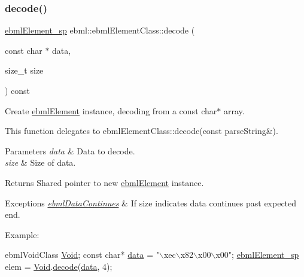 \subsubsection{\texorpdfstring{decode()}{decode()}\hspace{0.1cm}{\footnotesize\ttfamily [3/10]}}
{\footnotesize\ttfamily \mbox{\hyperlink{namespaceebml_adad533b7705a16bb360fe56380c5e7be}{ebml\+Element\+\_\+sp}} ebml\+::ebml\+Element\+Class\+::decode (\begin{DoxyParamCaption}\item[{const char $\ast$}]{data,  }\item[{size\+\_\+t}]{size }\end{DoxyParamCaption}) const}

Create \mbox{\hyperlink{classebml_1_1ebmlElement}{ebml\+Element}} instance, decoding from a const char$\ast$ array.

This function delegates to ebml\+Element\+Class\+::decode(const parse\+String\&).


\begin{DoxyParams}{Parameters}
{\em data} & Data to decode. \\
\hline
{\em size} & Size of \textquotesingle{}data\textquotesingle{}. \\
\hline
\end{DoxyParams}
\begin{DoxyReturn}{Returns}
Shared pointer to new \mbox{\hyperlink{classebml_1_1ebmlElement}{ebml\+Element}} instance. 
\end{DoxyReturn}

\begin{DoxyExceptions}{Exceptions}
{\em \mbox{\hyperlink{classebml_1_1ebmlDataContinues}{ebml\+Data\+Continues}}} & If \textquotesingle{}size\textquotesingle{} indicates \textquotesingle{}data\textquotesingle{} continues past expected end.\\
\hline
\end{DoxyExceptions}
Example\+: 
\begin{DoxyCode}
ebmlVoidClass \mbox{\hyperlink{namespaceebml_afbfd509d1cb71e416a07253746e886e9}{Void}};
\textcolor{keyword}{const} \textcolor{keywordtype}{char}* \mbox{\hyperlink{namespaceebml_ab21f8b4ff85186f670f17e84a02d9740}{data}} = \textcolor{stringliteral}{"\(\backslash\)xec\(\backslash\)x82\(\backslash\)x00\(\backslash\)x00"};
\mbox{\hyperlink{namespaceebml_adad533b7705a16bb360fe56380c5e7be}{ebmlElement\_sp}} elem = \mbox{\hyperlink{namespaceebml_afbfd509d1cb71e416a07253746e886e9}{Void}}.\mbox{\hyperlink{classebml_1_1ebmlElementClass_a9de19726c4794e4e3cb1f32e445c5002}{decode}}(\mbox{\hyperlink{namespaceebml_ab21f8b4ff85186f670f17e84a02d9740}{data}}, 4);
\end{DoxyCode}
 \mbox{\label{classebml_1_1ebmlElementClass_a2e45d73cfc2bfda5b4731af42299aaf1}} 
